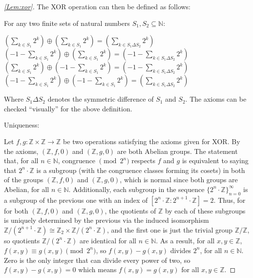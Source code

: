 \documentclass[1gpt]{article}
\makeatletter
\theoremstyle{break}
\theoremstyle{nonumberbreak}
\newtheorem{proof}{Proof}
\newenvironment{Prf}[1]{\begin{proof}[\ref{Lem:#1}]\makeatletter\def\@currentlabel{proof}\makeatother\label{Prf:#1}}{\end{proof}}
\newcommand{\NN}{\mathbb{N}}
\newcommand{\ZZ}{\mathbb{Z}}
\newcommand{\xor}{\oplus}
\makeatother
\begin{document}
\begin{Prf}{xor}
    The XOR operation can then be defined as follows:

    For any two finite sets of natural numbers $S_1, S_2 \subseteq \NN$:

    \begin{center}
        $\left(\sum_{k \in S_1}2^k\right) \xor \left(\sum_{k \in S_1}2^k\right) = \left(\sum_{k \in S_1 \Delta S_2}2^k\right)$ \\
        $\left(-1-\sum_{k \in S_1}2^k\right) \xor \left(\sum_{k \in S_1}2^k\right) = \left(-1-\sum_{k \in S_1 \Delta S_2}2^k\right)$ \\
        $\left(\sum_{k \in S_1}2^k\right) \xor \left(-1-\sum_{k \in S_1}2^k\right) = \left(-1-\sum_{k \in S_1 \Delta S_2}2^k\right)$ \\
        $\left(-1-\sum_{k \in S_1}2^k\right) \xor \left(-1-\sum_{k \in S_1}2^k\right) = \left(\sum_{k \in S_1 \Delta S_2}2^k\right)$
    \end{center}

    Where $S_1 \Delta S_2$ denotes the symmetric difference of $S_1$ and $S_2$. The axioms can be checked ``visually'' for the above definition.

    Uniqueness:

    Let $f, g: \ZZ \times \ZZ \longrightarrow \ZZ$ be two operations satisfying the axioms given for XOR. By the axioms, $(\ZZ, f, 0)$ and $(\ZZ, g, 0)$ are both Abelian groups. The statement that, for all $n \in \NN$, congruence $\pmod{2^n}$ respects $f$ and $g$ is equivalent to saying that $2^n \cdot \ZZ$ is a subgroup (with the congruence classes forming its cosets) in both of the groups $(\ZZ, f, 0)$ and $(\ZZ, g, 0)$, which is normal since both groups are Abelian, for all $n \in \NN$. Additionally, each subgroup in the sequence $\{ 2^n \cdot \ZZ \}_{n=0}^\infty$ is a subgroup of the previous one with an index of $[ 2^n \cdot \ZZ : 2^{n+1} \cdot \ZZ ] = 2$. Thus, for for both $(\ZZ, f, 0)$ and $(\ZZ, g, 0)$, the quotients of $\ZZ$ by each of these subgroups is uniquely determined by the previous via the induced isomorphism $\ZZ/(2^{n+1} \cdot \ZZ) \cong \ZZ_2 \times \ZZ/(2^n \cdot \ZZ)$, and the first one is just the trivial group $\ZZ/\ZZ$, so quotients $\ZZ/(2^n \cdot \ZZ)$ are identical  for all $n \in \NN$. As a result, for all $x, y \in \ZZ$, $f(x, y) \equiv g(x, y) \pmod{2^n}$, so $f(x, y) - g(x, y)$ divides $2^n$, for all $n \in \NN$. Zero is the only integer that can divide every power of two, so $f(x, y) - g(x, y) = 0$ which means $f(x, y) = g(x, y)$ for all $x, y \in \ZZ$.

\end{Prf}
\end{document}
